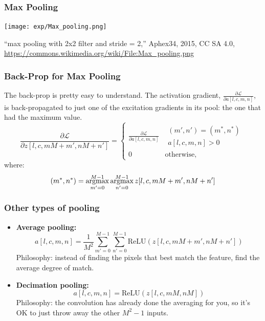 \documentclass{beamer}
\newcommand{\argmax}{\operatornamewithlimits{argmax}}
\begin{document}
\begin{frame}
  \frametitle{Max Pooling}
  \centerline{\texttt{[image: exp/Max\_pooling.png]}}
  \begin{tiny}
    ``max pooling with 2x2 filter and stride = 2,'' Aphex34, 2015, CC SA 4.0,
    \url{https://commons.wikimedia.org/wiki/File:Max_pooling.png}
  \end{tiny}
\end{frame}

\begin{frame}
  \frametitle{Back-Prop for Max Pooling}

  The back-prop is pretty easy to understand.  The activation gradient,
  $\frac{\partial{\mathcal L}}{\partial a[l,c,m,n]}$, is back-propagated to just one of
  the excitation gradients in its pool: the one that had the maximum value.
  \begin{displaymath}
  \frac{\partial{\mathcal L}}{\partial z[l,c,mM+m',nM+n']}=
  \begin{cases}
    \frac{\partial{\mathcal L}}{\partial a[l,c,m,n]}
    & \begin{array}{l}(m',n')=(m^*,n^*)\\a[l,c,m,n]>0\end{array}\\
    0 & \mbox{otherwise},
  \end{cases}
  \end{displaymath}
  where:
  \begin{displaymath}
    (m^*,n^*)=\argmax_{m'=0}^{M-1}\argmax_{n'=0}^{M-1}z[l,c,mM+m',nM+n']
  \end{displaymath}
\end{frame}

\begin{frame}
  \frametitle{Other types of pooling}
  \begin{itemize}
  \item {\bf Average pooling:}
    \begin{displaymath}
      a[l,c,m,n] = \frac{1}{M^2}\sum_{m'=0}^{M-1}\sum_{n'=0}^{M-1} \mbox{ReLU}\left(z[l,c,mM+m',nM+n']\right)
    \end{displaymath}
    Philosophy: instead of finding the pixels that best match the feature,
    find the average degree of match.
  \item {\bf Decimation pooling:}
    \begin{displaymath}
      a[l,c,m,n] = \mbox{ReLU}\left(z[l,c,mM,nM]\right)
    \end{displaymath}
    Philosophy: the convolution has already done the averaging for you, so
    it's OK to just  throw away the other $M^2-1$ inputs.
  \end{itemize}
\end{frame}
\end{document}
